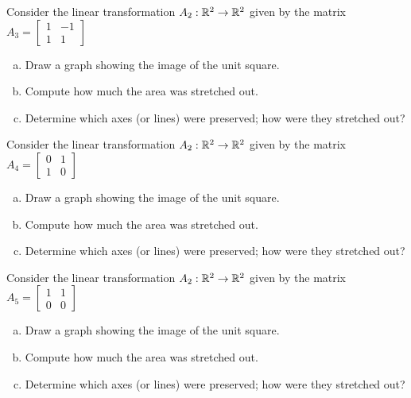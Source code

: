 \begin{applicationActivities}{1}{25}
\begin{activity}{5}
Consider the linear transformation  $A_2: \mathbb{R}^2 \rightarrow \mathbb{R}^2$ given by the matrix
 $A_3 = \begin{bmatrix} 1 & -1 \\ 1 & 1 \end{bmatrix}$

\begin{enumerate}[(a)]
\item Draw a graph showing the image of the unit square.
\item Compute how much the area was stretched out.
\item Determine which axes (or lines) were preserved; how were they stretched out?
\end{enumerate}
\end{activity}

\begin{activity}{5}
Consider the linear transformation  $A_2: \mathbb{R}^2 \rightarrow \mathbb{R}^2$ given by the matrix
 $A_4 = \begin{bmatrix} 0 & 1 \\ 1 & 0 \end{bmatrix}$

\begin{enumerate}[(a)]
\item Draw a graph showing the image of the unit square.
\item Compute how much the area was stretched out.
\item Determine which axes (or lines) were preserved; how were they stretched out?
\end{enumerate}
\end{activity}

\begin{activity}{5}
Consider the linear transformation  $A_2: \mathbb{R}^2 \rightarrow \mathbb{R}^2$ given by the matrix
 $A_5 = \begin{bmatrix} 1 & 1 \\ 0 & 0 \end{bmatrix}$

\begin{enumerate}[(a)]
\item Draw a graph showing the image of the unit square.
\item Compute how much the area was stretched out.
\item Determine which axes (or lines) were preserved; how were they stretched out?
\end{enumerate}
\end{activity}



\end{applicationActivities}
